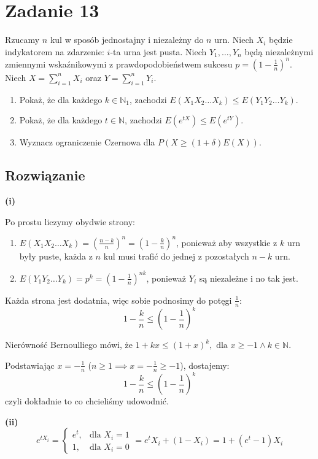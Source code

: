 \section{Zadanie 13}
Rzucamy \(n\) kul w sposób jednostajny i niezależny do \(n\) urn. Niech \(X_i\) będzie indykatorem na zdarzenie: \(i\)-ta urna jest pusta. Niech \(Y_1, \dots, Y_n\) będą niezależnymi zmiennymi wskaźnikowymi z prawdopodobieństwem sukcesu \(p = \left(1 - \frac{1}{n}\right)^n\). Niech \(X = \sum_{i=1}^n X_i\) oraz \(Y = \sum_{i=1}^n Y_i\).

\begin{enumerate}
	\item[(i)] Pokaż, że dla każdego \(k \in \mathbb{N}_1\), zachodzi \(E(X_1 X_2 \dots X_k) \le E(Y_1 Y_2 \dots Y_k)\).
	\item[(ii)] Pokaż, że dla każdego \(t \in \mathbb{N}\), zachodzi \(E(e^{tX}) \le E(e^{tY})\).
	\item[(iii)] Wyznacz ograniczenie Czernowa dla \(P(X \ge (1 + \delta) E(X))\).
\end{enumerate}

\subsection*{Rozwiązanie}

\textbf{(i)}

Po prostu liczymy obydwie strony:
\begin{enumerate}
	\item \(E(X_1 X_2 \dots X_k) = \left(\frac{n-k}{n}\right)^n = \left(1 - \frac{k}{n}\right)^n\), ponieważ aby wszystkie z \(k\) urn były puste, każda z \(n\) kul musi trafić do jednej z pozostałych \(n-k\) urn.
	\item \(E(Y_1 Y_2 \dots Y_k) = p^k =  \left(1 - \frac{1}{n}\right)^{nk}\), ponieważ \(Y_i\) są niezależne i no tak jest.
\end{enumerate}
Każda strona jest dodatnia, więc sobie podnosimy do potęgi \(\frac{1}{n}\):
\[1-\frac{k}{n} \le \left(1 - \frac{1}{n}\right)^{k}\]

Nierówność Bernoulliego mówi, że \(1 + kx \le (1+x)^k, \text{ dla } x \ge -1 \land k \in \mathbb{N}\).

Podstawiając \(x = -\frac{1}{n}\) (\(n \ge 1 \implies x = -\frac{1}{n} \ge -1\)), dostajemy:
\[1 - \frac{k}{n} \le \left(1 - \frac{1}{n}\right)^{k}\]
czyli dokładnie to co chcieliśmy udowodnić.

\textbf{(ii)}
\[
	e^{t X_i} = \left\{
	\begin{array}{ll}
		e^t, & \text{dla } X_i = 1 \\
		1,   & \text{dla } X_i = 0
	\end{array}
	\right. = e^t X_i + (1 - X_i) = 1 + (e^t - 1) X_i
\]

